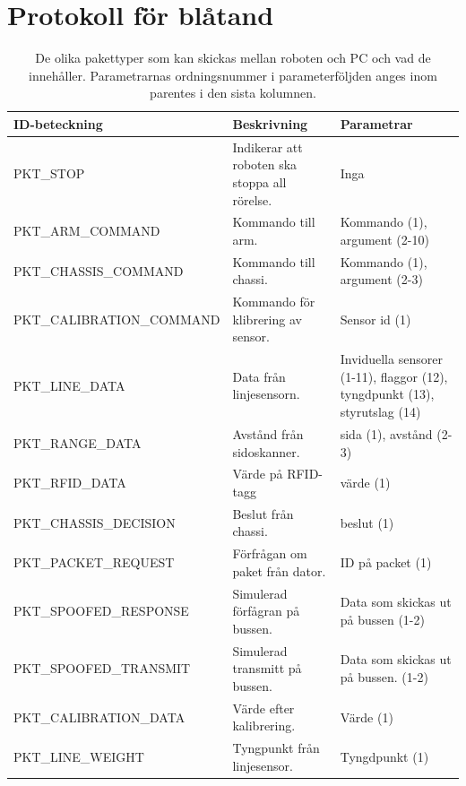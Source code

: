 \section{Protokoll för blåtand}
\begin{table}[H]
\label{packets}
\begin{tabularx}{\textwidth}{|l|X|X|}
\hline
\textbf{ID-beteckning} & \textbf{Beskrivning} & \textbf{Parametrar} \\ \hline
PKT\_STOP & Indikerar att roboten ska stoppa all rörelse. & Inga \\ \hline
PKT\_ARM\_COMMAND & Kommando till arm. & Kommando (1), argument (2-10) \\ \hline
PKT\_CHASSIS\_COMMAND & Kommando till chassi. & Kommando (1), argument (2-3) \\ \hline
PKT\_CALIBRATION\_COMMAND & Kommando för klibrering av sensor. & Sensor id (1) \\ \hline
PKT\_LINE\_DATA & Data från linjesensorn. & Inviduella sensorer (1-11), flaggor (12), tyngdpunkt (13), styrutslag (14) \\ \hline
PKT\_RANGE\_DATA & Avstånd från sidoskanner. & sida (1), avstånd (2-3) \\ \hline
PKT\_RFID\_DATA & Värde på RFID-tagg & värde (1) \\ \hline
PKT\_CHASSIS\_DECISION & Beslut från chassi. & beslut (1) \\ \hline
PKT\_PACKET\_REQUEST & Förfrågan om paket från dator. & ID på packet (1) \\ \hline
PKT\_SPOOFED\_RESPONSE & Simulerad förfågran på bussen. & Data som skickas ut på bussen (1-2) \\ \hline
PKT\_SPOOFED\_TRANSMIT & Simulerad transmitt på bussen. & Data som skickas ut på bussen. (1-2) \\ \hline
PKT\_CALIBRATION\_DATA & Värde efter kalibrering. & Värde (1) \\ \hline
PKT\_LINE\_WEIGHT & Tyngpunkt från linjesensor. & Tyngdpunkt (1) \\ \hline
\end{tabularx}
\caption{De olika pakettyper som kan skickas mellan roboten och PC och vad de innehåller. Parametrarnas ordningsnummer i parameterföljden anges inom parentes i den sista kolumnen.}
\end{table}

